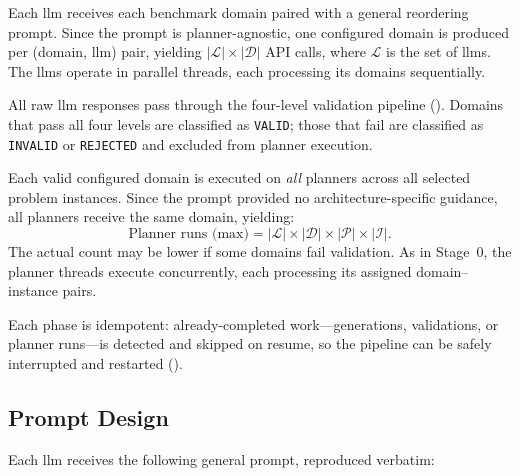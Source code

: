 \begin{description}[style=nextline, leftmargin=1.5cm]
  \item[\textbf{Phase~A} (LLM Generation):]
    Each \gls{llm} receives each benchmark domain paired with a general reordering prompt.
    Since the prompt is planner-agnostic, one configured domain is produced per (domain, \gls{llm}) pair, yielding $|\mathcal{L}| \times |\mathcal{D}|$ API calls, where $\mathcal{L}$ is the set of \glspl{llm}.
    The \glspl{llm} operate in parallel threads, each processing its domains sequentially.

  \item[\textbf{Phase~B} (Validation):]
    All raw \gls{llm} responses pass through the four-level validation pipeline ().
    Domains that pass all four levels are classified as \texttt{VALID}; those that fail are classified as \texttt{INVALID} or \texttt{REJECTED} and excluded from planner execution.

  \item[\textbf{Phase~C} (Planner Execution):]
    Each valid configured domain is executed on \emph{all} planners across all selected problem instances.
    Since the prompt provided no architecture-specific guidance, all planners receive the same domain, yielding:
    \begin{equation}\label{eq:stage1_runs}
      \text{Planner runs (max)} = |\mathcal{L}| \times |\mathcal{D}| \times |\mathcal{P}| \times |\mathcal{I}|.
    \end{equation}
    The actual count may be lower if some domains fail validation.
    As in Stage~0, the planner threads execute concurrently, each processing its assigned domain--instance pairs.
\end{description}

Each phase is idempotent: already-completed work---generations, validations, or planner runs---is detected and skipped on resume, so the pipeline can be safely interrupted and restarted ().

\subsection{Prompt Design}
\label{sec:design:stage1:prompt}

Each \gls{llm} receives the following general prompt, reproduced verbatim:

